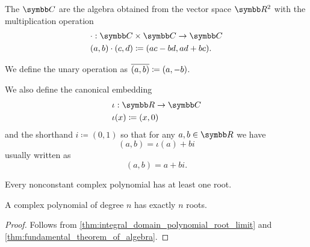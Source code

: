 \begin{definition}\label{def:complex_numbers}
  The  \( \Co \) are the algebra obtained from the vector space \( \R^2 \) with the multiplication operation
  \begin{align*}
    &\cdot: \Co \times \Co \to \Co \\
    &(a, b) \cdot (c, d) \coloneqq (ac - bd, ad + bc).
  \end{align*}

  We define the unary  operation as \( \overline{(a, b)} \coloneqq (a, -b) \).

  We also define the canonical embedding
  \begin{align*}
    &\iota: \R \to \Co \\
    &\iota(x) \coloneqq (x, 0)
  \end{align*}
  and the shorthand \( i \coloneqq (0, 1) \) so that for any \( a, b \in \R \) we have
  \begin{equation*}
    (a, b) = \iota(a) + bi
  \end{equation*}
  usually written as
  \begin{equation*}
    (a, b) = a + bi.
  \end{equation*}
\end{definition}

\begin{theorem}\label{thm:fundamental_theorem_of_algebra}
  Every nonconstant complex polynomial has at least one root.
\end{theorem}

\begin{corollary}\label{thm:complex_polynomials_have_n_roots}
  A complex polynomial of degree \( n \) has exactly \( n \) roots.
\end{corollary}
\begin{proof}
  Follows from \cref{thm:integral_domain_polynomial_root_limit} and \cref{thm:fundamental_theorem_of_algebra}.
\end{proof}
